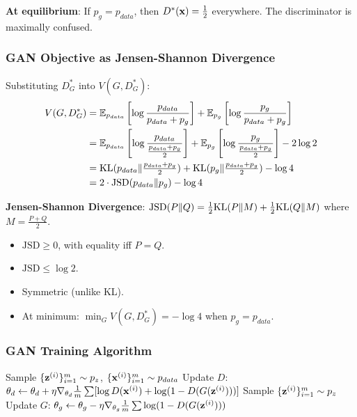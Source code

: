 \textbf{At equilibrium}: If $p_g = p_{data}$, then $D^*(\mathbf{x}) = \frac{1}{2}$ everywhere. The discriminator is maximally confused.

\subsubsection{GAN Objective as Jensen-Shannon Divergence}
Substituting $D^*_G$ into $V(G, D^*_G)$:
\begin{align}
V(G, D^*_G) &= \mathbb{E}_{p_{data}}\left[\log\frac{p_{data}}{p_{data}+p_g}\right] + \mathbb{E}_{p_g}\left[\log\frac{p_g}{p_{data}+p_g}\right] \nonumber\\
&= \mathbb{E}_{p_{data}}\left[\log\frac{p_{data}}{\frac{p_{data}+p_g}{2}}\right] + \mathbb{E}_{p_g}\left[\log\frac{p_g}{\frac{p_{data}+p_g}{2}}\right] - 2\log 2 \nonumber\\
&= \text{KL}(p_{data}\|\tfrac{p_{data}+p_g}{2}) + \text{KL}(p_g\|\tfrac{p_{data}+p_g}{2}) - \log 4 \nonumber\\
&= 2\cdot\text{JSD}(p_{data}\|p_g) - \log 4 \label{eq:gan_jsd}
\end{align}

\textbf{Jensen-Shannon Divergence}: $\text{JSD}(P\|Q) = \frac{1}{2}\text{KL}(P\|M) + \frac{1}{2}\text{KL}(Q\|M)$ where $M = \frac{P+Q}{2}$.
\begin{itemize}
\item $\text{JSD} \geq 0$, with equality iff $P = Q$.
\item $\text{JSD} \leq \log 2$.
\item Symmetric (unlike KL).
\item At minimum: $\min_G V(G, D^*_G) = -\log 4$ when $p_g = p_{data}$.
\end{itemize}

\subsubsection{GAN Training Algorithm}
\begin{algorithm}[H]
\caption{GAN Training (per iteration)}
\small
\begin{algorithmic}[1]
  
    \State Sample $\{\mathbf{z}^{(i)}\}_{i=1}^m \sim p_z$, $\{\mathbf{x}^{(i)}\}_{i=1}^m \sim p_{data}$
    \State Update $D$: $\theta_d \leftarrow \theta_d + \eta\nabla_{\theta_d}\frac{1}{m}\sum[\log D(\mathbf{x}^{(i)}) + \log(1-D(G(\mathbf{z}^{(i)})))]$
\EndFor
\State Sample $\{\mathbf{z}^{(i)}\}_{i=1}^m \sim p_z$
\State Update $G$: $\theta_g \leftarrow \theta_g - \eta\nabla_{\theta_g}\frac{1}{m}\sum\log(1-D(G(\mathbf{z}^{(i)})))$
\end{algorithmic}
\end{algorithm}

